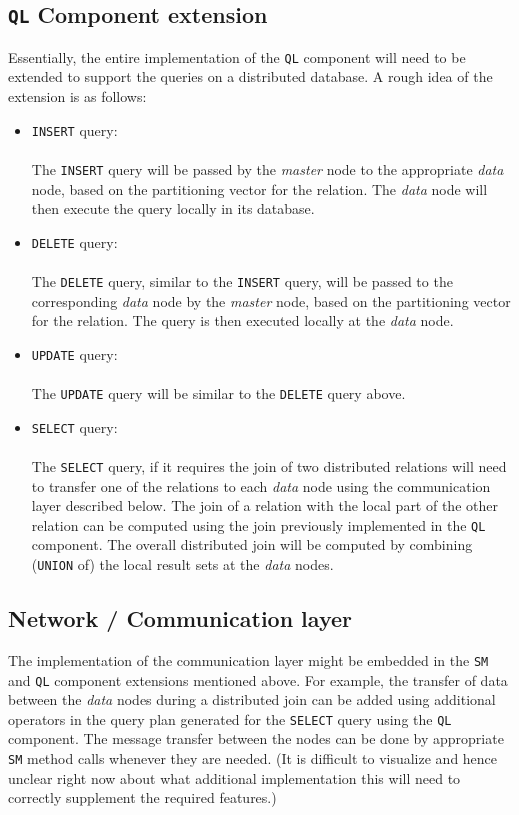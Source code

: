 \documentclass[letterpaper,11pt]{article}
\begin{document}
\subsection{\texttt{QL} Component extension}
Essentially, the entire implementation of the \texttt{QL} component will need to be extended to
support the queries on a distributed database. A rough idea of the extension is as follows:
\begin{itemize}
\item \texttt{INSERT} query:\\
\\The \texttt{INSERT} query will be passed by the \textit{master} node to the appropriate
\textit{data} node, based on the partitioning vector for the relation. The \textit{data} node
will then execute the query locally in its database.

\item \texttt{DELETE} query:\\
\\The \texttt{DELETE} query, similar to the \texttt{INSERT} query, will be passed to the corresponding
\textit{data} node by the \textit{master} node, based on the partitioning vector for the relation.
The query is then executed locally at the \textit{data} node.

\item \texttt{UPDATE} query:\\
\\The \texttt{UPDATE} query will be similar to the \texttt{DELETE} query above.

\item \texttt{SELECT} query:\\
\\The \texttt{SELECT} query, if it requires the join of two distributed relations will need to
transfer one of the relations to each \textit{data} node using the communication layer described
below. The join of a relation with the local part of the other relation can be computed using the
join previously implemented in the \texttt{QL} component. The overall distributed join will be computed
by combining (\texttt{UNION} of) the local result sets at the \textit{data} nodes.

\end{itemize}

\subsection{Network / Communication layer}
The implementation of the communication layer might be embedded in the \texttt{SM} and \texttt{QL}
component extensions mentioned above. For example, the transfer of data between the \textit{data}
nodes during a distributed join can be added using additional operators in the query plan generated
for the \texttt{SELECT} query using the \texttt{QL} component. The message transfer between the
nodes can be done by appropriate \texttt{SM} method calls whenever they are needed. (It is difficult
to visualize and hence unclear right now about what additional implementation this will need to
correctly supplement the required features.)
\end{document}
